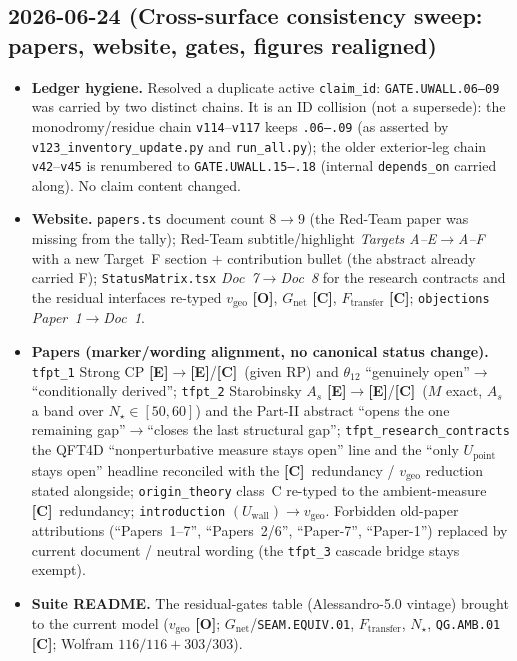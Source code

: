 \documentclass[11pt]{article}
\providecommand{\mE}{\textbf{[E]}}\providecommand{\mC}{\textbf{[C]}}
\providecommand{\mO}{\textbf{[O]}}\providecommand{\mX}{\textbf{[X]}}
\begin{document}
\subsection*{2026-06-24 (Cross-surface consistency sweep: papers, website, gates, figures realigned)}
\begin{itemize}
\item \textbf{Ledger hygiene.} Resolved a duplicate active \texttt{claim\_id}: \texttt{GATE.UWALL.06--09} was carried by two distinct chains. It is an ID collision (not a supersede): the monodromy/residue chain \texttt{v114}--\texttt{v117} keeps \texttt{.06--.09} (as asserted by \texttt{v123\_inventory\_update.py} and \texttt{run\_all.py}); the older exterior-leg chain \texttt{v42}--\texttt{v45} is renumbered to \texttt{GATE.UWALL.15--.18} (internal \texttt{depends\_on} carried along). No claim content changed.
\item \textbf{Website.} \texttt{papers.ts} document count $8\to9$ (the Red-Team paper was missing from the tally); Red-Team subtitle/highlight \emph{Targets A--E}$\to$\emph{A--F} with a new Target~F section $+$ contribution bullet (the abstract already carried F); \texttt{StatusMatrix.tsx} \emph{Doc~7}$\to$\emph{Doc~8} for the research contracts and the residual interfaces re-typed $v_{\mathrm{geo}}$ \mO, $G_{\mathrm{net}}$ \mC, $F_{\mathrm{transfer}}$ \mC; \texttt{objections} \emph{Paper~1}$\to$\emph{Doc~1}.
\item \textbf{Papers (marker/wording alignment, no canonical status change).} \texttt{tfpt\_1} Strong CP \mE$\to$\mE/\mC\ (given RP) and $\theta_{12}$ ``genuinely open''$\to$``conditionally derived''; \texttt{tfpt\_2} Starobinsky $A_s$ \mE$\to$\mE/\mC\ ($M$ exact, $A_s$ a band over $N_\star\in[50,60]$) and the Part-II abstract ``opens the one remaining gap''$\to$``closes the last structural gap''; \texttt{tfpt\_research\_contracts} the QFT4D ``nonperturbative measure stays open'' line and the ``only $U_{\mathrm{point}}$ stays open'' headline reconciled with the \mC\ redundancy / $v_{\mathrm{geo}}$ reduction stated alongside; \texttt{origin\_theory} class~C re-typed to the ambient-measure \mC\ redundancy; \texttt{introduction} $(U_{\mathrm{wall}})\to v_{\mathrm{geo}}$. Forbidden old-paper attributions (``Papers~1--7'', ``Papers~2/6'', ``Paper-7'', ``Paper-1'') replaced by current document / neutral wording (the \texttt{tfpt\_3} cascade bridge stays exempt).
\item \textbf{Suite README.} The residual-gates table (Alessandro-5.0 vintage) brought to the current model ($v_{\mathrm{geo}}$ \mO; $G_{\mathrm{net}}$/\texttt{SEAM.EQUIV.01}, $F_{\mathrm{transfer}}$, $N_\star$, \texttt{QG.AMB.01} \mC; Wolfram $116/116+303/303$).

\end{itemize}
\end{document}
